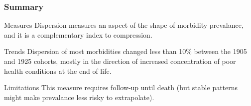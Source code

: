 \documentclass[20pt]{beamer}
\begin{document}
\begin{frame}
\frametitle{Summary}
\begin{block}{Measures}
Dispersion measures an aspect of the shape of morbidity prevalance, and it is a
complementary index to compression. 
\end{block}
\pause
\begin{block}{Trends}
Dispersion of most morbidities changed less than 10\% between the 1905 and 1925
cohorts, mostly in the direction of increased concentration of poor health
conditions at the end of life.
\end{block}
\pause
\begin{block}{Limitations}
This measure requires follow-up until death (but stable patterns might make
prevalance less risky to extrapolate). 
\end{block}
\end{frame}

\end{document}
